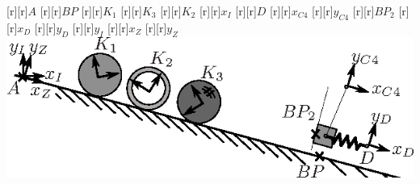 {%
[r][r]{$A$}%
[r][r]{$BP$}%
[r][r]{$K_1$}%
[r][r]{$K_3$}%
[r][r]{$K_2$}%
[r][r]{$x_I$}%
[r][r]{$D$}%
[r][r]{$x_{C4}$}%
[r][r]{$y_{C4}$}%
[r][r]{$BP_2$}%
[r][r]{$x_D$}%
[r][r]{$y_D$}%
[r][r]{$y_I$}%
[r][r]{$x_Z$}%
[r][r]{$y_Z$}%
\includegraphics{rollen}%
}
